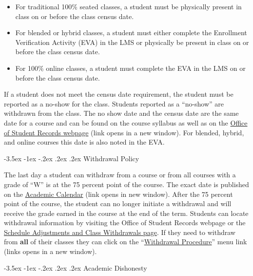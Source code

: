 \documentclass[11pt]{article}
\makeatletter
\renewcommand\section{\@startsection{section}{1}{0pt}%
  {-3.5ex \@plus -1ex \@minus -.2ex}%
  {.2ex \@plus.2ex}%
  {\normalfont\Large\bfseries}} %
\makeatother
\begin{document}
\begin{itemize}
\item For traditional 100\% seated classes, a student must be physically present in class on or before the class census date.


\item For blended or hybrid classes, a student must either complete the Enrollment Verification Activity (EVA) in the LMS or physically be present in class on or before the class census date.


\item For 100\% online classes, a student must complete the EVA in the LMS on or before the class census date.
\end{itemize}

If a student does not meet the census date requirement, the student must be reported as a no-show for the class. Students reported as a ``no-show'' are withdrawn from the class.  The no show date and the census date are the same date for a course and can be found on the course syllabus as well as on the \href{https://mitchellcc.edu/office-student-records}{Office of Student Records webpage} (link opens in a new window). For blended, hybrid, and online courses this date is also noted in the EVA.

\section{Withdrawal Policy}

The last day a student can withdraw from a course or from all courses with a grade of ``W'' is at the 75 percent point of the course. The exact date is published on the \href{https://www.mitchellcc.edu/wp-content/uploads/2024/05/2024-2025-Academic-Calendar.pdf}{Academic Calendar} (link opens in new window). After the 75 percent point of the course, the student can no longer initiate a withdrawal and will receive the grade earned in the course at the end of the term. Students can locate withdrawal information by visiting the Office of Student Records webpage or the \href{https://www.mitchellcc.edu/schedule-adjustments-and-class-withdrawals/}{Schedule Adjustments and Class Withdrawals page}. If they need to withdraw from \textbf{all} of their classes they can click on the ``\href{https://mitchellcc.edu/withdrawal-procedure}{Withdrawal Procedure}'' menu link (links opens in a new window).

\section{Academic Dishonesty}
\end{document}
